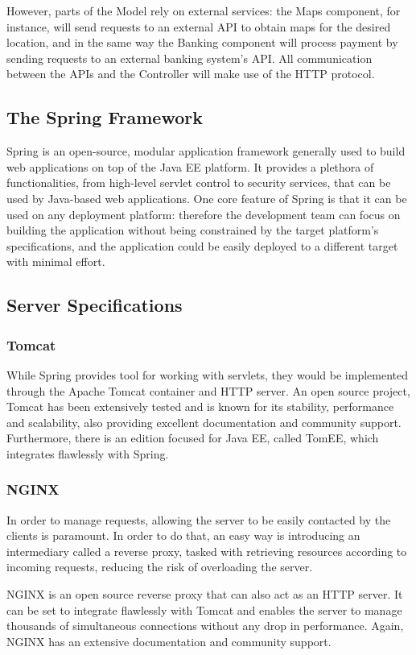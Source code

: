 \documentclass[12pt]{article}
\begin{document}
However, parts of the Model rely on external services: the Maps component, for instance, will send requests to an external API to obtain maps for the desired location, and in the same way the Banking component will process payment by sending requests to an external banking system's API. All communication between the APIs and the Controller will make use of the HTTP protocol.
\subsection{The Spring Framework}
Spring is an open-source, modular application framework generally used to build web applications on top of the Java EE platform. It provides a plethora of functionalities, from high-level servlet control to security services, that can be used by Java-based web applications. One core feature of Spring is that it can be used on any deployment platform: therefore the development team can focus on building the application without being constrained by the target platform's specifications, and the application could be easily deployed to a different target with minimal effort.

\subsection{Server Specifications}
\subsubsection{Tomcat}
While Spring provides tool for working with servlets, they would be implemented through the Apache Tomcat container and HTTP server. An open source project, Tomcat has been extensively tested and is known for its stability, performance and scalability, also providing excellent documentation and community support. Furthermore, there is an edition focused for Java EE, called TomEE, which integrates flawlessly with Spring.

\subsubsection{NGINX}
In order to manage requests, allowing the server to be easily contacted by the clients is paramount. In order to do that, an easy way is introducing an intermediary called a reverse proxy, tasked with retrieving resources according to incoming requests, reducing the risk of overloading the server.

NGINX is an open source reverse proxy that can also act as an HTTP server. It can be set to integrate flawlessly with Tomcat and enables the server to manage thousands of simultaneous connections without any drop in performance. Again, NGINX has an extensive documentation and community support.
\end{document}
